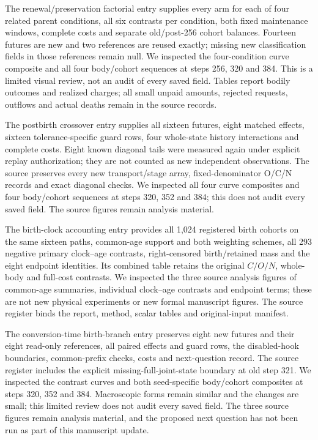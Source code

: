 The renewal/preservation factorial entry supplies every arm for each of four related parent conditions, all six contrasts per condition, both fixed maintenance windows, complete costs and separate old/post-256 cohort balances. Fourteen futures are new and two references are reused exactly; missing new classification fields in those references remain null. We inspected the four-condition curve composite and all four body/cohort sequences at steps 256, 320 and 384. This is a limited visual review, not an audit of every saved field. Tables report bodily outcomes and realized charges; all small unpaid amounts, rejected requests, outflows and actual deaths remain in the source records.

The postbirth crossover entry supplies all sixteen futures, eight matched effects, sixteen tolerance-specific guard rows, four whole-state history interactions and complete costs. Eight known diagonal tails were measured again under explicit replay authorization; they are not counted as new independent observations. The source preserves every new transport/stage array, fixed-denominator O/C/N records and exact diagonal checks. We inspected all four curve composites and four body/cohort sequences at steps 320, 352 and 384; this does not audit every saved field. The source figures remain analysis material.

The birth-clock accounting entry provides all 1,024 registered birth cohorts on the same sixteen paths, common-age support and both weighting schemes, all 293 negative primary clock--age contrasts, right-censored birth/retained mass and the eight endpoint identities. Its combined table retains the original $C/O/N$, whole-body and full-cost contrasts. We inspected the three source analysis figures of common-age summaries, individual clock--age contrasts and endpoint terms; these are not new physical experiments or new formal manuscript figures. The source register binds the report, method, scalar tables and original-input manifest.

The conversion-time birth-branch entry preserves eight new futures and their eight read-only references, all paired effects and guard rows, the disabled-hook boundaries, common-prefix checks, costs and next-question record. The source register includes the explicit missing-full-joint-state boundary at old step 321. We inspected the contrast curves and both seed-specific body/cohort composites at steps 320, 352 and 384. Macroscopic forms remain similar and the changes are small; this limited review does not audit every saved field. The three source figures remain analysis material, and the proposed next question has not been run as part of this manuscript update.

